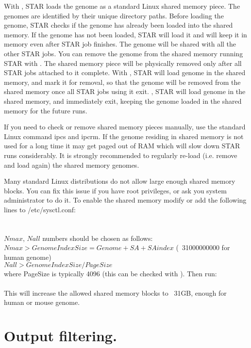 \documentclass[12pt]{article}
\begin{document}
With  , STAR loads the genome as a standard Linux shared memory piece. The genomes are identified by their unique directory paths. Before loading the genome, STAR checks if the genome has already been loaded into the shared memory.  If the genome has not been loaded, STAR  will load it and will keep it in memory even after STAR job finishes. The genome will be shared with all the other STAR jobs. You can remove the genome from the shared memory running STAR with  . The shared memory piece will be physically removed only after all STAR jobs attached to it complete. With  , STAR will load genome in the shared memory, and mark it for removal, so that the genome will be removed from the shared memory once all STAR jobs using it exit.  , STAR will load genome in the shared memory, and immediately exit, keeping the genome loaded in the shared memory for the future runs.

If you need to check or remove shared memory pieces manually, use the standard Linux command ipcs and ipcrm. If the genome residing in shared memory is not used for a long time it may get paged out of RAM which will slow down STAR runs considerably. It is strongly recommended to regularly re-load (i.e. remove and load again) the shared memory genomes.

Many standard Linux distributions do not allow large enough shared memory blocks. You can fix this issue if you have root privileges, or ask you system administrator to do it. To enable the shared memory modify or add the following lines to /etc/sysctl.conf:\\
\\
\\
$Nmax$, $Nall$ numbers should be chosen as follows:\\
$Nmax > GenomeIndexSize=Genome + SA + SAindex$ (~31000000000 for human genome)\\
$Nall > GenomeIndexSize/PageSize$ \\
where PageSize is typically 4096 (this can be checked with ).
Then run:\\
\\
This will increase the allowed shared memory blocks to ~31GB, enough for human or mouse genome.

\section{Output filtering.}\label{Output_filtering}
\end{document}
